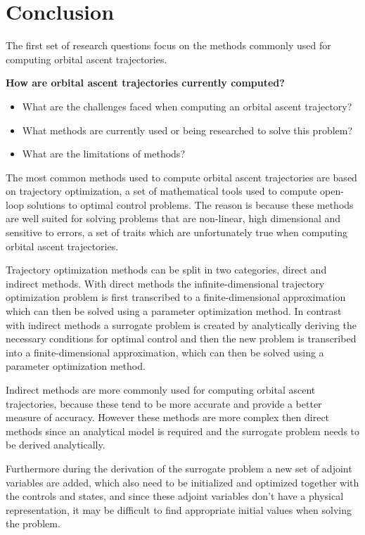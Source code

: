\chapter{Conclusion}
The first set of research questions focus on the methods commonly used for computing orbital ascent trajectories. 

\textbf{How are orbital ascent trajectories currently computed?}
\begin{itemize}
  \item What are the challenges faced when computing an orbital ascent trajectory?
  \item What methods are currently used or being researched to solve this problem?
  \item What are the limitations of methods?
\end{itemize}

The most common methods used to compute orbital ascent trajectories are based on trajectory optimization, a set of mathematical tools used to compute open-loop solutions to optimal control problems. The reason is because these methods are well suited for solving problems that are non-linear, high dimensional and sensitive to errors, a set of traits which are unfortunately true when computing orbital ascent trajectories.

Trajectory optimization methods can be split in two categories, direct and indirect methods. With direct methods the infinite-dimensional trajectory optimization problem is first transcribed to a finite-dimensional approximation which can then be solved using a parameter optimization method. In contrast with indirect methods a surrogate problem is created by analytically deriving the necessary conditions for optimal control and then the new problem is transcribed into a finite-dimensional approximation, which can then be solved using a parameter optimization method.

Indirect methods are more commonly used for computing orbital ascent trajectories, because these tend to be more accurate and provide a better measure of accuracy. However these methods are more complex then direct methods since an analytical model is required and the surrogate problem needs to be derived analytically.

Furthermore during the derivation of the surrogate problem a new set of adjoint variables are added, which also need to be initialized and optimized together with the controls and states, and since these adjoint variables don't have a physical representation, it may be difficult to find appropriate initial values when solving the problem.

